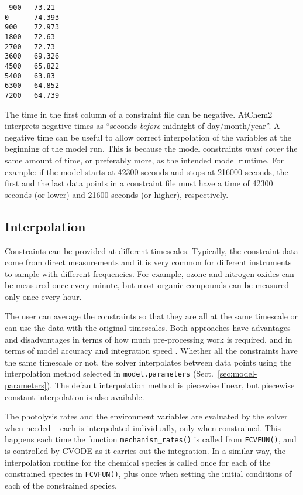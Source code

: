 \begin{verbatim}
-900   73.21
0      74.393
900    72.973
1800   72.63
2700   72.73
3600   69.326
4500   65.822
5400   63.83
6300   64.852
7200   64.739
\end{verbatim}

The time in the first column of a constraint file can be negative.
AtChem2 interprets negative times as ``seconds \emph{before} midnight
of day/month/year''. A negative time can be useful to allow correct
interpolation of the variables at the beginning of the model run. This
is because the model constraints \emph{must cover} the same amount of
time, or preferably more, as the intended model runtime. For example:
if the model starts at 42300 seconds and stops at 216000 seconds, the
first and the last data points in a constraint file must have a time
of 42300 seconds (or lower) and 21600 seconds (or higher),
respectively.

\subsection{Interpolation} \label{subsec:interpolation}

Constraints can be provided at different timescales. Typically, the
constraint data come from direct measurements and it is very common
for different instruments to sample with different frequencies. For
example, ozone and nitrogen oxides can be measured once every minute,
but most organic compounds can be measured only once every hour.

The user can average the constraints so that they are all at the same
timescale or can use the data with the original timescales. Both
approaches have advantages and disadvantages in terms of how much
pre-processing work is required, and in terms of model accuracy and
integration speed \citep{sommariva_2019}. Whether all the constraints
have the same timescale or not, the solver interpolates between data
points using the interpolation method selected in
\texttt{model.parameters} (Sect.~\ref{sec:model-parameters}). The
default interpolation method is piecewise linear, but piecewise
constant interpolation is also available.

The photolysis rates and the environment variables are evaluated by
the solver when needed -- each is interpolated individually, only when
constrained. This happens each time the function
\texttt{mechanism\_rates()} is called from \texttt{FCVFUN()}, and is
controlled by CVODE as it carries out the integration. In a
similar way, the interpolation routine for the chemical species is
called once for each of the constrained species in \texttt{FCVFUN()},
plus once when setting the initial conditions of each of the
constrained species.

